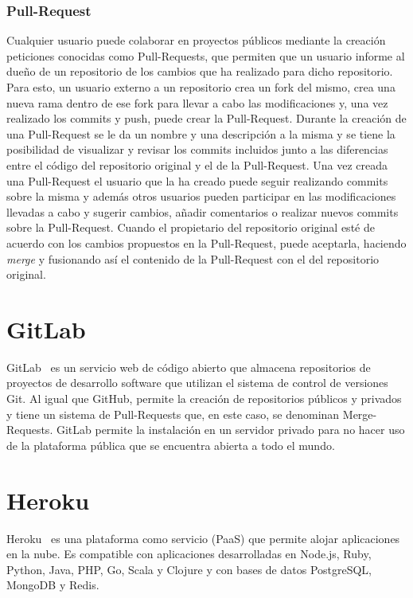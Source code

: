 \documentclass[a4paper, 12pt]{book}
\begin{document}
\subsubsection{Pull-Request}
Cualquier usuario puede colaborar en proyectos públicos mediante la creación peticiones conocidas como Pull-Requests, que permiten que un usuario informe al dueño de un repositorio de los cambios que ha realizado para dicho repositorio.
Para esto, un usuario externo a un repositorio crea un fork del mismo, crea una nueva rama dentro de ese fork para llevar a cabo las modificaciones y, una vez realizado los commits y push, puede crear la Pull-Request.
Durante la creación de una Pull-Request se le da un nombre y una descripción a la misma y se tiene la posibilidad de visualizar y revisar los commits incluidos junto a las diferencias entre el código del repositorio original y el de la Pull-Request.
Una vez creada una Pull-Request el usuario que la ha creado puede seguir realizando commits sobre la misma y además otros usuarios pueden participar en las modificaciones llevadas a cabo y sugerir cambios, añadir comentarios o realizar nuevos commits sobre la Pull-Request.
Cuando el propietario del repositorio original esté de acuerdo con los cambios propuestos en la Pull-Request, puede aceptarla, haciendo \textit{merge} y fusionando así el contenido de la Pull-Request con el del repositorio original.

\section{GitLab} 
\label{sec:gitlab}

GitLab~\cite{gitlab} es un servicio web de código abierto que almacena repositorios de proyectos de desarrollo software que utilizan el sistema de control de versiones Git. Al igual que GitHub, permite la creación de repositorios públicos y privados y tiene un sistema de Pull-Requests que, en este caso, se denominan Merge-Requests.
GitLab permite la instalación en un servidor privado para no hacer uso de la plataforma pública que se encuentra abierta a todo el mundo.

\section{Heroku} 
\label{sec:Heroku}

Heroku~\cite{heroku} es una plataforma como servicio (PaaS) que permite alojar aplicaciones en la nube. Es compatible con aplicaciones desarrolladas en Node.js, Ruby, Python, Java, PHP, Go, Scala y Clojure y con bases de datos PostgreSQL, MongoDB y Redis.
\end{document}
